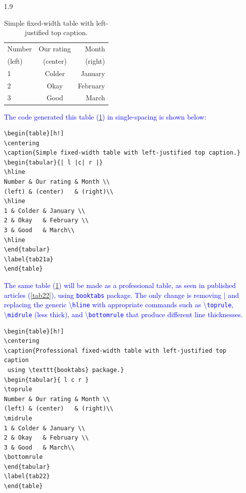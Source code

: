 \documentclass[phd]{ndsu-thesis-2022}
\newcommand\myspacing{1.9} %
\newcommand\italk[1]{\textcolor{blue}{#1}}  %
\newcommand\cmd[1]{\textbackslash\texttt{#1}}  %
\begin{document}
\begin{spacing}{\myspacing}
\begin{table}[h!]
\centering
\caption{Simple fixed-width table with left-justified top caption.}
\begin{tabular}{| l |c| r |}
\hline
Number & Our rating & Month \\
(left) & (center)   & (right)\\
\hline
1 & Colder & January \\
2 & Okay   & February \\
3 & Good   & March\\
\hline
\end{tabular}
\label{tab21}
\end{table}

\italk{The code generated this table (\cref{tab21}) in single-spacing is shown below:}

{\singlespacing
\begin{verbatim}
\begin{table}[h!]
\centering
\caption{Simple fixed-width table with left-justified top caption.}
\begin{tabular}{| l |c| r |}
\hline
Number & Our rating & Month \\
(left) & (center)   & (right)\\
\hline
1 & Colder & January \\
2 & Okay   & February \\
3 & Good   & March\\
\hline
\end{tabular}
\label{tab21a}
\end{table}
\end{verbatim}
}

\italk{The same table (\cref{tab21}) will be made as a professional table, as seen in published articles (\cref{tab22}), using \texttt{booktabs} package. The only change is removing | and replacing the generic \cmd{hline} with appropriate commands such as \cmd{toprule}, \cmd{midrule} (less thick), and \cmd{bottomrule} that produce different line thicknesses.
}

{\singlespacing
\begin{verbatim}
\begin{table}[h!]
\centering
\caption{Professional fixed-width table with left-justified top caption
 using \texttt{booktabs} package.}
\begin{tabular}{ l c r }
\toprule
Number & Our rating & Month \\
(left) & (center)   & (right)\\
\midrule
1 & Colder & January \\
2 & Okay   & February \\
3 & Good   & March\\
\bottomrule
\end{tabular}
\label{tab22}
\end{table}
\end{verbatim}
}\label{tabcode22}


\end{spacing}
\end{document}
